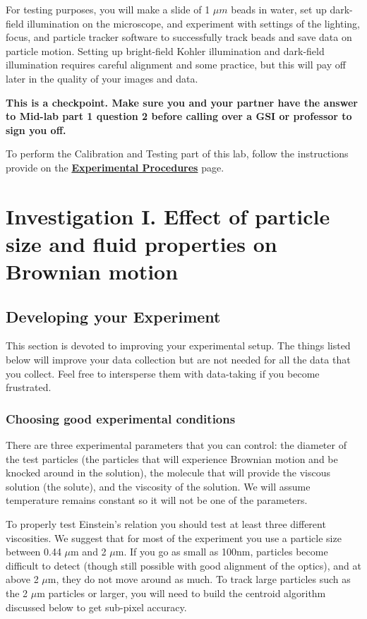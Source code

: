 \documentclass{../lab}
\begin{document}
For testing purposes, you will make a slide of 1 $\mu m$ beads in water, set up dark-field illumination on the microscope, and experiment with settings of the lighting, focus, and particle tracker software to successfully track beads and save data on particle motion. Setting up bright-field Kohler illumination and dark-field illumination requires careful alignment and some practice, but this will pay off later in the quality of your images and data.

\textbf{This is a checkpoint. Make sure you and your partner have the answer to Mid-lab part 1 question 2 before calling over a GSI or professor to sign you off.}

To perform the Calibration and Testing part of this lab, follow the instructions provide on the \href{http://experimentationlab.berkeley.edu/node/84}{\textbf{Experimental Procedures}} page.

\section{Investigation I. Effect of particle size and fluid properties on Brownian motion}
\label{sec:InvestigationI}

\subsection{Developing your Experiment}

This section is devoted to improving your experimental setup. The things listed below will improve your data collection but are not needed for all the data that you collect. Feel free to intersperse them with data-taking if you become frustrated.

\subsubsection{Choosing good experimental conditions}

There are three experimental parameters that you can control: the diameter of the test particles (the particles that will experience Brownian motion and be knocked around in the solution), the molecule that will provide the viscous solution (the solute), and the viscosity of the solution. We will assume temperature remains constant so it will not be one of the parameters.

To properly test Einstein's relation you should test at least three different viscosities. We suggest that for most of the experiment you use a particle size between 0.44 $\mu$m and 2 $\mu$m. If you go as small as 100nm, particles become difficult to detect (though still possible with good alignment of the optics), and at above 2 $\mu$m, they do not move around as much. To track large particles such as the 2 $\mu$m particles or larger, you will need to build the centroid algorithm discussed below to get sub-pixel accuracy.
\end{document}
